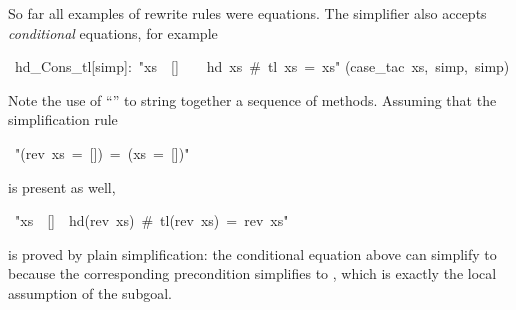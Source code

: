 \begin{isabelle}%
%
\begin{isamarkuptext}%
So far all examples of rewrite rules were equations. The simplifier also
accepts \emph{conditional} equations, for example%
\end{isamarkuptext}%
~hd\_Cons\_tl[simp]:~{"}xs~{\isasymnoteq}~[]~~{\isasymLongrightarrow}~~hd~xs~\#~tl~xs~=~xs{"}\isanewline
{}(case\_tac~xs,~simp,~simp)%
\begin{isamarkuptext}%
\noindent
Note the use of ``'' to string together a
sequence of methods. Assuming that the simplification rule%
\end{isamarkuptext}%
~{"}(rev~xs~=~[])~=~(xs~=~[]){"}%
\begin{isamarkuptext}%
\noindent
is present as well,%
\end{isamarkuptext}%
~{"}xs~{\isasymnoteq}~[]~{\isasymLongrightarrow}~hd(rev~xs)~\#~tl(rev~xs)~=~rev~xs{"}%
\begin{isamarkuptext}%
\noindent
is proved by plain simplification:
the conditional equation  above
can simplify  to 
because the corresponding precondition 
simplifies to , which is exactly the local
assumption of the subgoal.%
\end{isamarkuptext}%
\end{isabelle}%

